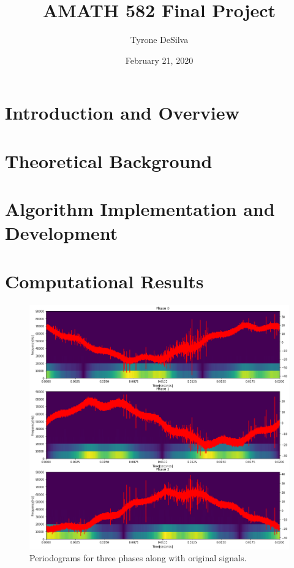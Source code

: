 \documentclass{article}
\title{AMATH 582 Final Project}
\author{Tyrone DeSilva}
\date{February 21, 2020}
\begin{document}
\maketitle

\begin{abstract}
\end{abstract}

\section{Introduction and Overview}

\section{Theoretical Background}

\section{Algorithm Implementation and Development}

\section{Computational Results}
\begin{figure}
    \centering
    \includegraphics[width=0.8\linewidth]{stft.png}
    \caption{Periodograms for three phases along with original signals.}
    \label{fig:periodogram}
\end{figure}
\end{document}
